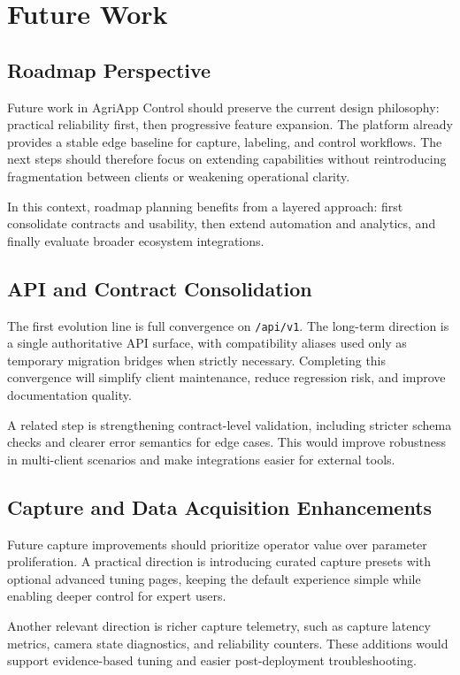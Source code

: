 \section{Future Work}

\subsection{Roadmap Perspective}
Future work in AgriApp Control should preserve the current design philosophy: practical reliability first, then progressive feature expansion. The platform already provides a stable edge baseline for capture, labeling, and control workflows. The next steps should therefore focus on extending capabilities without reintroducing fragmentation between clients or weakening operational clarity.

In this context, roadmap planning benefits from a layered approach: first consolidate contracts and usability, then extend automation and analytics, and finally evaluate broader ecosystem integrations.

\subsection{API and Contract Consolidation}
The first evolution line is full convergence on \texttt{/api/v1}. The long-term direction is a single authoritative API surface, with compatibility aliases used only as temporary migration bridges when strictly necessary. Completing this convergence will simplify client maintenance, reduce regression risk, and improve documentation quality.

A related step is strengthening contract-level validation, including stricter schema checks and clearer error semantics for edge cases. This would improve robustness in multi-client scenarios and make integrations easier for external tools.

\subsection{Capture and Data Acquisition Enhancements}
Future capture improvements should prioritize operator value over parameter proliferation. A practical direction is introducing curated capture presets with optional advanced tuning pages, keeping the default experience simple while enabling deeper control for expert users.

Another relevant direction is richer capture telemetry, such as capture latency metrics, camera state diagnostics, and reliability counters. These additions would support evidence-based tuning and easier post-deployment troubleshooting.

